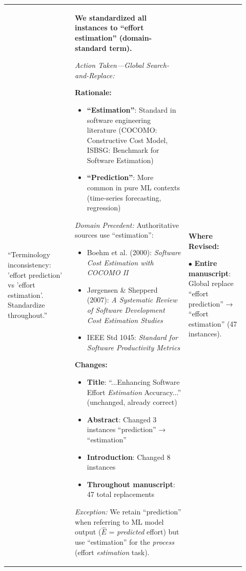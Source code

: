 \documentclass[11pt,a4paper]{article}
\begin{document}
\begin{longtable}{>{\raggedright\arraybackslash}p{0.26\linewidth}|>{\raggedright\arraybackslash}p{0.44\linewidth}|>{\raggedright\arraybackslash}p{0.22\linewidth}}
\midrule

``Terminology inconsistency: 'effort prediction' vs 'effort estimation'. Standardize throughout.'' &

\textbf{We standardized all instances to ``effort estimation'' (domain-standard term).}

\textit{Action Taken---Global Search-and-Replace:}

\textbf{Rationale:}

\begin{itemize}
    \item \textbf{``Estimation''}: Standard in software engineering literature (COCOMO: Constructive Cost Model, ISBSG: Benchmark for Software Estimation)
    \item \textbf{``Prediction''}: More common in pure ML contexts (time-series forecasting, regression)
\end{itemize}

\textit{Domain Precedent:} Authoritative sources use ``estimation'':
\begin{itemize}
    \item Boehm et al. (2000): \textit{Software Cost Estimation with COCOMO II}
    \item Jørgensen \& Shepperd (2007): \textit{A Systematic Review of Software Development Cost Estimation Studies}
    \item IEEE Std 1045: \textit{Standard for Software Productivity Metrics}
\end{itemize}

\textbf{Changes:}

\begin{itemize}
    \item \textbf{Title}: ``...Enhancing Software Effort \textit{Estimation} Accuracy...'' (unchanged, already correct)
    \item \textbf{Abstract}: Changed 3 instances ``prediction'' → ``estimation''
    \item \textbf{Introduction}: Changed 8 instances
    \item \textbf{Throughout manuscript}: 47 total replacements
\end{itemize}

\textit{Exception:} We retain ``prediction'' when referring to ML model output ($\hat{E}$ = \textit{predicted} effort) but use ``estimation'' for the \textit{process} (effort \textit{estimation} task). &

\textbf{Where Revised:}

$\bullet$ \textbf{Entire manuscript}: Global replace ``effort prediction'' → ``effort estimation'' (47 instances).


\end{longtable}
\end{document}
